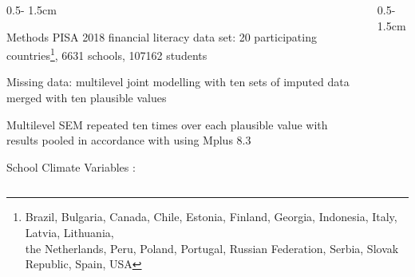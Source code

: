 \documentclass{uioposter}
\begin{document}
\begin{frame}
\begin{columns}[onlytextwidth]
\begin{column}{0.5\textwidth - 1.5cm}


    \begin{block}{Methods}
        PISA 2018 financial literacy data set: 20 participating countries\footnote{Brazil, Bulgaria, Canada, Chile, Estonia, Finland, Georgia, Indonesia, Italy, Latvia, Lithuania,\\the Netherlands, Peru, Poland, Portugal, Russian Federation, Serbia, Slovak Republic, Spain, USA}, 6631 schools, 107162 students

        Missing data: multilevel joint modelling \parencite{asparouhov:2010} with ten sets of imputed data merged with ten plausible values

        Multilevel SEM repeated ten times over each plausible value with results pooled in accordance with \textcite{rubin:1987} using Mplus 8.3

        School Climate Variables \parencite{wang:2016}:
        \vspace{-1cm}\small
        
    \end{block}

\end{column}

\begin{column}{0.5\textwidth - 1.5cm}


\end{column}
\end{columns}
\end{frame}
\end{document}
